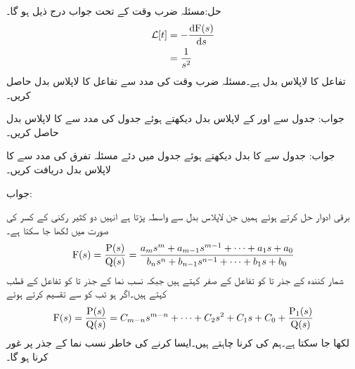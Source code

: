 حل:مسئلہ ضرب وقت کے تحت جواب درج ذیل ہو گا۔
\begin{align*}
\Laplace[t]&=-\frac{\dif \bF(s)}{\dif s}\\
&=\frac{1}{s^2}
\end{align*}
تفاعل  کا لاپلاس بدل  ہے۔مسئلہ ضرب وقت کی مدد سے تفاعل  کا لاپلاس بدل حاصل کریں۔

جواب:
جدول  سے  اور  کے لاپلاس بدل دیکھتے ہوئے جدول   کی مدد سے  کا لاپلاس بدل حاصل کریں۔

جواب:
جدول  سے  کا بدل دیکھتے ہوئے جدول   میں دئے مسئلہ تفرق کی مدد سے  کا لاپلاس بدل دریافت کریں۔

جواب:

برقی ادوار حل کرتے ہوئے ہمیں جن لاپلاس بدل سے واسطہ پڑتا ہے انہیں دو کثیر رکنی کے کسر کی صورت میں لکھا جا سکتا ہے۔
\begin{align}
{\ensuremath{{\textup{F}}}}(s)=\frac{{{\textup{P}}}(s)}{{{\textup{Q}}}(s)}=\frac{a_m s^m+a_{m-1} s^{m-1}+\cdots+a_1 s+a_0}{b_n s^n+b_{n-1} s^{n-1}+\cdots+b_1 s+b_0}
\end{align}
شمار کنندہ  کے جذر  تا   کو تفاعل کے صفر کہتے ہیں جبکہ نسب نما  کے جذر   تا  کو تفاعل کے قطب کہتے ہیں۔اگر  ہو تب  کو  سے تقسیم کرتے ہوئے
\begin{align}
{\ensuremath{{\textup{F}}}}(s)=\frac{{{\textup{P}}}(s)}{{{\textup{Q}}}(s)}=C_{m-n}s^{m-n}+\cdots+C_2 s^2+C_1 s+C_0+\frac{{{\textup{P}}}_1(s)}{{{\textup{Q}}}(s)}
\end{align}
لکھا جا سکتا ہے۔ہم  کی  کرنا چاہتے ہیں۔ایسا کرنے کی خاطر نسب نما  کے جذر پر غور کرنا ہو گا۔

